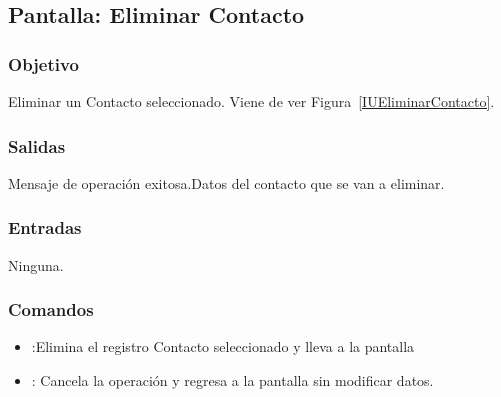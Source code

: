 \subsection{Pantalla: Eliminar Contacto}

\subsubsection{Objetivo}
Eliminar un Contacto seleccionado. Viene de  ver Figura~\ref{IUEliminarContacto}.


\subsubsection{Salidas}
Mensaje de operación exitosa.Datos del contacto que se van a eliminar.

\subsubsection{Entradas}
Ninguna.

\subsubsection{Comandos}
\begin{itemize}
 \item {}:Elimina el registro Contacto seleccionado y lleva a la pantalla  
 \item {}: Cancela la operación y regresa a la pantalla  sin modificar datos.
\end{itemize}





